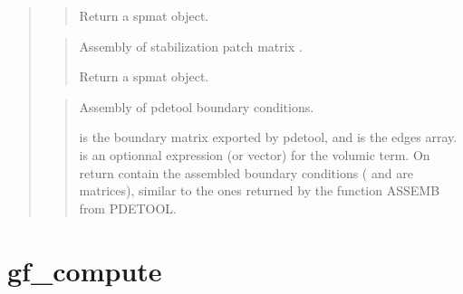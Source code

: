 \documentclass[a4paper,11pt,english]{sphinxmanual}
\begin{document}
\begin{quote}
\begin{quote}
Return a spmat object.
\end{quote}

\begin{quote}

Assembly of stabilization patch matrix .

Return a spmat object.
\end{quote}

\begin{quote}

Assembly of pdetool boundary conditions.

 is the boundary matrix exported by pdetool, and  is the
edges array.  is an optionnal expression (or vector) for
the volumic term. On return  contain the assembled
boundary conditions ( and  are matrices), similar to the
ones returned by the function ASSEMB from PDETOOL.
\end{quote}
\end{quote}


\section{gf\_compute}
\label{\detokenize{matlab_octave/cmdref_gf_compute:gf-compute}}\label{\detokenize{matlab_octave/cmdref_gf_compute::doc}}
\end{document}
